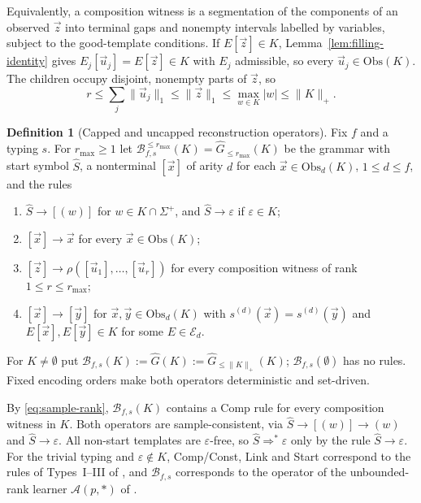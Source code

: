 \documentclass[11pt]{article}
\numberwithin{equation}{section}
\theoremstyle{plain}
\theoremstyle{definition}
\newtheorem{definition}[theorem]{Definition}
\theoremstyle{remark}
\newcommand{\tuple}[1]{\vec{#1}}
\newcommand{\eps}{\varepsilon}
\theoremstyle{plain}
\begin{document}
Equivalently, a composition witness is a segmentation of the components of an
observed $\tuple z$ into terminal gaps and nonempty intervals labelled by
variables, subject to the good-template conditions.  If $E[\tuple z]\in K$,
Lemma~\ref{lem:filling-identity} gives $E_j[\tuple u_j]=E[\tuple z]\in K$ with
$E_j$ admissible, so every $\tuple u_j\in\mathrm{Obs}(K)$.  The children occupy
disjoint, nonempty parts of $\tuple z$, so
\begin{equation}
\label{eq:sample-rank}
 r\le\textstyle\sum_j\|\tuple u_j\|_1\le\|\tuple z\|_1\le\max_{w\in K}|w|
 \le\|K\|_+ .
\end{equation}

\begin{definition}[Capped and uncapped reconstruction operators]
\label{def:reconstruction}
Fix $f$ and a typing $s$.  For $r_{\max}\ge1$ let
$\mathcal B_{f,s}^{\le r_{\max}}(K)=\widehat G_{\le r_{\max}}(K)$ be the
grammar with start symbol $\widehat S$, a nonterminal $[\tuple x]$ of arity
$d$ for each $\tuple x\in\mathrm{Obs}_d(K)$, $1\le d\le f$, and the rules
\begin{enumerate}[leftmargin=*]
\item[\textnormal{(Start)}] $\widehat S\to[(w)]$ for $w\in K\cap\Sigma^+$, and
      $\widehat S\to\eps$ if $\eps\in K$;
\item[\textnormal{(Const)}] $[\tuple x]\to\tuple x$ for every
      $\tuple x\in\mathrm{Obs}(K)$;
\item[\textnormal{(Comp)}] $[\tuple z]\to\rho([\tuple u_1],\ldots,[\tuple u_r])$
      for every composition witness of rank $1\le r\le r_{\max}$;
\item[\textnormal{(Link)}] $[\tuple x]\to[\tuple y]$ for
      $\tuple x,\tuple y\in\mathrm{Obs}_d(K)$ with
      $s^{(d)}(\tuple x)=s^{(d)}(\tuple y)$ and $E[\tuple x],E[\tuple y]\in K$
      for some $E\in\mathcal E_d$.
\end{enumerate}
For $K\ne\emptyset$ put $\mathcal B_{f,s}(K):=\widehat G(K):=
\widehat G_{\le\|K\|_+}(K)$; $\mathcal B_{f,s}(\emptyset)$ has no rules.
Fixed encoding orders make both operators deterministic and set-driven.
\end{definition}

By \eqref{eq:sample-rank}, $\mathcal B_{f,s}(K)$ contains a Comp rule for every
composition witness in $K$.  Both operators are sample-consistent, via
$\widehat S\to[(w)]\to(w)$ and $\widehat S\to\eps$.  All non-start templates
are $\eps$-free, so $\widehat S\Rightarrow^*\eps$ only by the rule
$\widehat S\to\eps$.  For the trivial typing and $\eps\notin K$, Comp/Const, Link
and Start correspond to the rules of Types~I--III of
\cite[Section~4.1]{Yoshinaka2011}, and $\mathcal B_{f,s}$ corresponds to the
operator of the unbounded-rank learner
$\mathcal A(p,*)$ of \cite[Corollary~2]{Yoshinaka2011}.
\end{document}
